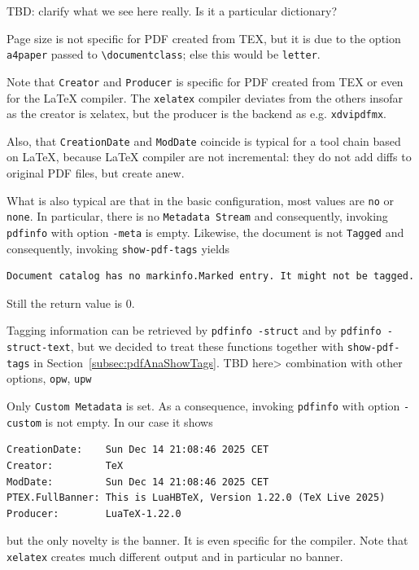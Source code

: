 \documentclass[a4paper, USenglish]{article}%
\makeatletter
\newcommand{\cmd}[2][]{\texttt{\textbackslash{}#2#1}}
\newcommand{\cmd}[2][]{\texttt{\textbackslash{}#2#1}\sindex[cmd]{#2@\texttt{\textbackslash{}#2}}}%
\makeatother
\begin{document}
TBD\@: clarify what we see here really. 
Is it a particular dictionary? 

Page size is not specific for PDF created from TEX, but it is due to the option \texttt{a4paper} 
passed to \cmd{documentclass}; else this would be \texttt{letter}. 

Note that \texttt{Creator} and \texttt{Producer} is specific for PDF created from TEX or even for the \LaTeX{} compiler. 
The \texttt{xelatex} compiler deviates from the others insofar as the creator is xelatex, but the producer is the backend as e.g. \texttt{xdvipdfmx}. 

Also, that \texttt{CreationDate} and \texttt{ModDate} coincide is typical for a tool chain based on \LaTeX, 
because \LaTeX{} compiler are not incremental: they do not add diffs to original PDF files, 
but create anew. 

What is also typical are that in the basic configuration, most values are \texttt{no} or \texttt{none}. 
In particular, there is no \texttt{Metadata Stream} and consequently, invoking \texttt{pdfinfo} with option \texttt{-meta} is empty. 
Likewise, the document is not \texttt{Tagged} and consequently, invoking \texttt{show-pdf-tags} yields 
%
\begin{verbatim}
Document catalog has no markinfo.Marked entry. It might not be tagged.
\end{verbatim}
%
Still the return value is $0$. 

Tagging information can be retrieved by \texttt{pdfinfo -struct} and by \texttt{pdfinfo -struct-text}, 
but we decided to treat these functions together with \texttt{show-pdf-tags} in Section~\ref{subsec:pdfAnaShowTags}. 
TBD here> combination with other options, \texttt{opw}, \texttt{upw}



Only \texttt{Custom Metadata} is set. 
As a consequence, invoking \texttt{pdfinfo} with option \texttt{-custom} is not empty. 
In our case it shows 
%
\begin{verbatim}
CreationDate:    Sun Dec 14 21:08:46 2025 CET
Creator:         TeX
ModDate:         Sun Dec 14 21:08:46 2025 CET
PTEX.FullBanner: This is LuaHBTeX, Version 1.22.0 (TeX Live 2025)
Producer:        LuaTeX-1.22.0
\end{verbatim}
%
but the only novelty is the banner. 
It is even specific for the compiler. 
Note that \texttt{xelatex} creates much different output and in particular no banner. 
\end{document}
